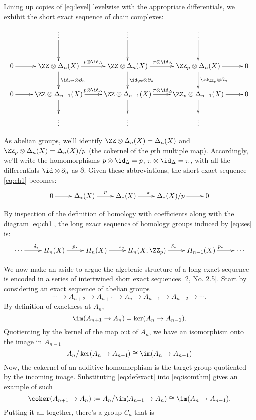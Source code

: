 \documentclass[10pt]{amsart}
\begin{document}
Lining up copies of \eqref{eq:level} levelwise with the appropriate
differentials, we exhibit the short exact sequence of chain complexes:
\begin{equation}
\xymatrix{
& \vdots \ar[d] & \vdots \ar[d] & \vdots \ar[d] &\\
0 \ar[r] & \ZZ\otimes \Delta_n(X) \ar[d]^{\id_\ZZ \otimes \partial_n} \ar[r]^{p\otimes \id_\Delta} & \ZZ\otimes \Delta_n(X) \ar[d]^{\id_\ZZ \otimes \partial_n} \ar[r]^{\pi\otimes \id_\Delta} & \ZZ_p \otimes\Delta_n(X) \ar[d]^{\id_{\ZZ_p} \otimes \partial_n}\ar[r]&  0\\
0 \ar[r] & \ZZ\otimes \Delta_{n-1}(X) \ar[d] \ar[r]^{p\otimes \id_\Delta}  & \ZZ\otimes \Delta_{n-1}(X) \ar[d] \ar[r]^{\pi\otimes \id_\Delta} & \ZZ_p \otimes\Delta_{n-1}(X) \ar[d] \ar[r]&  0\\
& \vdots & \vdots & \vdots  &\\
}
\label{eq:ch1}
\end{equation}

As abelian groups, we'll identify
\(\ZZ \otimes \Delta_n(X) = \Delta_n(X)\) and
\(\ZZ_p \otimes \Delta_n(X) = \Delta_n(X)/p\) (the cokernel of the
\(p\)th multiple map). Accordingly, we'll write the homomorphisms
\(p \otimes \id_\Delta = p\), \(\pi \otimes \id_\Delta = \pi\), with all
the differentials \(\id \otimes \partial_n\) as \(\partial\). Given
these abbreviations, the short exact sequence \eqref{eq:ch1} becomes:
\begin{equation}
\xymatrix{
0 \ar[r] & \Delta_*(X) \ar[r]^{p} &\Delta_*(X) \ar[r]^{\pi} & \Delta_*(X)/p \ar[r]&  0
}
\label{eq:ses}
\end{equation}

By inspection of the definition of homology with coefficients along with
the diagram \eqref{eq:ch1}, the long exact sequence of homology groups
induced by \eqref{eq:ses} is: \begin{equation}
\xymatrix{
\cdots \ar[r]^{\delta_*} & H_n(X) \ar[r]^{ p_* } & H_n(X) \ar[r]^{ \pi_* } & H_n(X; \ZZ_p) \ar[r]^{\delta_*} & H_{n-1}(X) \ar[r]^{p_*} & \cdots
}
\label{eq:les}
\end{equation}

We now make an aside to argue the algebraic structure of a long exact
sequence is encoded in a series of intertwined short exact sequences
{[}2, No. 2.5{]}. Start by considering an exact sequence of abelian
groups
\[\cdots \to A_{n+2} \to A_{n+1} \to A_{n} \to A_{n-1} \to A_{n-2} \to \cdots.\]
By definition of exactness at \(A_n\),
\begin{equation}\label{eq:defexact}\im (A_{n+1} \to A_n) = \ker(A_n \to A_{n-1}).\end{equation}
Quotienting by the kernel of the map out of \(A_n\), we have an
isomorphism onto the image in \(A_{n-1}\) \begin{equation}
A_n/\ker (A_n \to A_{n-1}) \cong \im(A_n \to A_{n-1}) 
\label{eq:isomthm}
\end{equation} Now, the cokernel of an additive homomorphism is the
target group quotiented by the incoming image. Substituting
\eqref{eq:defexact} into \eqref{eq:isomthm} gives an example of such
\[\coker ( A_{n+1} \to A_n) := A_n/\im (A_{n+1} \to A_n) \cong \im(A_n \to A_{n-1}).\]
Putting it all together, there's a group \(C_n\) that is
\end{document}
